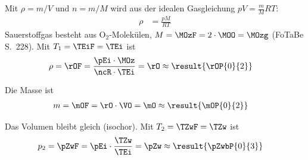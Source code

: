 \begin{abcliste}
\abc Mit $\rho = m/V$ und $n = m/M$ wird aus der idealen Gasgleichung $pV = \frac{m}{M}RT$:
\begin{align}
 \rho &= \frac{pM}{RT}
\end{align}
Sauerstoffgas besteht aus $\mathrm{O_2}$-Molekülen, $M = \MOzF = 2\cdot\MOO = \MOzg$ (FoTaBe S.~228). Mit $T_1 = \TEiF = \TEi$ ist
\begin{align}
 \rho &= \rOF = \frac{\pEi\cdot\MOz}{\ncR\cdot\TEi} = \rO \approx \result{\rOP{0}{2}}
\end{align}

\abc Die Masse ist
\begin{align}
 m &= \mOF = \rO\cdot\VO = \mO \approx \result{\mOP{0}{2}}
\end{align}

\abc Das Volumen bleibt gleich (isochor). Mit $T_2 = \TZwF = \TZw$ ist
\begin{align}
 p_2 &= \pZwF = \pEi\cdot\frac{\TZw}{\TEi} = \pZw \approx \result{\pZwbP{0}{3}}
\end{align}
\end{abcliste}
